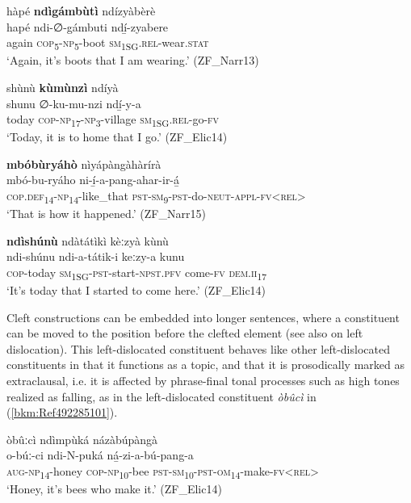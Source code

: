 \ea
\label{bkm:Ref75336657}
hàpé \textbf{ndìgámbùtì} ndízyàbèrè\\
\gll hapé  ndi-∅-gámbuti  ndí̲-zyabere\\
again  \textsc{cop}\textsubscript{5}-\textsc{np}\textsubscript{5}-boot  \textsc{sm}\textsubscript{1SG}.\textsc{rel}-wear.\textsc{stat}\\
\glt ‘Again, it’s boots that I am wearing.’ (ZF\_Narr13)
\z

\ea
\label{bkm:Ref75336658}
shùnù \textbf{kùmùnzì} ndíyà\\
\gll shunu  ∅-ku-mu-nzi    ndí̲-y-a\\
today  \textsc{cop}-\textsc{np}\textsubscript{17}-\textsc{np}\textsubscript{3}-village  \textsc{sm}\textsubscript{1SG}.\textsc{rel}-go-\textsc{fv}\\
\glt ‘Today, it is to home that I go.’ (ZF\_Elic14)
\z

\ea
\label{bkm:Ref75336660}
\textbf{mbóbùryáhò} nìyápàngàhàrírà\\
\gll mbó-bu-ryáho    ni-í̲-a-pang-ahar-ir-á̲\\
\textsc{cop}.\textsc{def}\textsubscript{14}-\textsc{np}\textsubscript{14}-like\_that  \textsc{pst}-\textsc{sm}\textsubscript{9}-\textsc{pst}-do-\textsc{neut}-\textsc{appl}-\textsc{fv}<\textsc{rel}>\\
\glt ‘That is how it happened.’ (ZF\_Narr15)
\z

\ea
\label{bkm:Ref75336661}
\textbf{ndìshúnù} ndàtátìkì kèːzyà kùnù\\
\gll ndi-shúnu  ndi-a-tátik-i      keːzy-a  kunu\\
\textsc{cop}-today  \textsc{sm}\textsubscript{1SG}-\textsc{pst}-start-\textsc{npst}.\textsc{pfv}  come-\textsc{fv}  \textsc{dem}.\textsc{ii}\textsubscript{17}\\
\glt ‘It’s today that I started to come here.’ (ZF\_Elic14)
\z

\hspace*{-2.7pt}Cleft constructions can be embedded into longer sentences, where a constituent can be moved to the position before the clefted element (see also  on left dislocation). This left-dislocated constituent behaves like other left-dislocated constituents in that it functions as a topic, and that it is prosodically marked as extraclausal, i.e. it is affected by phrase-final tonal processes such as high tones realized as falling, as in the left-dislocated constituent \textit{òbûcì} in (\ref{bkm:Ref492285101}).

\ea
\label{bkm:Ref492285101}
òbûːcì ndìmpùká názàbúpàngà\\
\gll o-búː-ci    ndi-N-puká    ná̲-zi-a-bú-pang-a\\
\textsc{aug}-\textsc{np}\textsubscript{14}-honey  \textsc{cop}-\textsc{np}\textsubscript{10}-bee  \textsc{pst}-\textsc{sm}\textsubscript{10}-\textsc{pst}-\textsc{om}\textsubscript{14}-make-\textsc{fv}<\textsc{rel}>\\
\glt ‘Honey, it’s bees who make it.’ (ZF\_Elic14)
\z

